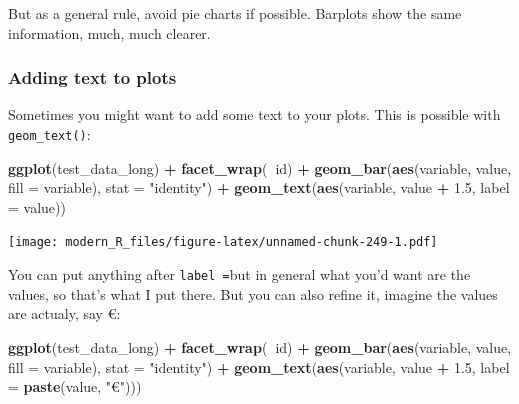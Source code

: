 \documentclass[]{gitbook}
\newenvironment{Shaded}{\begin{snugshade}}{\end{snugshade}}
\newcommand{\DataTypeTok}[1]{\textcolor[rgb]{0.13,0.29,0.53}{#1}}
\newcommand{\FloatTok}[1]{\textcolor[rgb]{0.00,0.00,0.81}{#1}}
\newcommand{\KeywordTok}[1]{\textcolor[rgb]{0.13,0.29,0.53}{\textbf{#1}}}
\newcommand{\NormalTok}[1]{#1}
\newcommand{\OperatorTok}[1]{\textcolor[rgb]{0.81,0.36,0.00}{\textbf{#1}}}
\newcommand{\StringTok}[1]{\textcolor[rgb]{0.31,0.60,0.02}{#1}}
\theoremstyle{definition}
\theoremstyle{definition}
\theoremstyle{definition}
\theoremstyle{remark}
\begin{document}
But as a general rule, avoid pie charts if possible. Barplots show the
same information, much, much clearer.

\hypertarget{adding-text-to-plots}{%
\subsubsection{Adding text to plots}\label{adding-text-to-plots}}

Sometimes you might want to add some text to your plots. This is
possible with \texttt{geom\_text()}:

\begin{Shaded}
\begin{Highlighting}[]
\KeywordTok{ggplot}\NormalTok{(test_data_long) }\OperatorTok{+}
\StringTok{  }\KeywordTok{facet_wrap}\NormalTok{(}\OperatorTok{~}\NormalTok{id) }\OperatorTok{+}
\StringTok{  }\KeywordTok{geom_bar}\NormalTok{(}\KeywordTok{aes}\NormalTok{(variable, value, }\DataTypeTok{fill =}\NormalTok{ variable), }\DataTypeTok{stat =} \StringTok{"identity"}\NormalTok{) }\OperatorTok{+}
\StringTok{  }\KeywordTok{geom_text}\NormalTok{(}\KeywordTok{aes}\NormalTok{(variable, value }\OperatorTok{+}\StringTok{ }\FloatTok{1.5}\NormalTok{, }\DataTypeTok{label =}\NormalTok{ value))}
\end{Highlighting}
\end{Shaded}

\texttt{[image: modern\_R\_files/figure-latex/unnamed-chunk-249-1.pdf]}

You can put anything after \texttt{label\ =}but in general what you'd
want are the values, so that's what I put there. But you can also refine
it, imagine the values are actualy, say €:

\begin{Shaded}
\begin{Highlighting}[]
\KeywordTok{ggplot}\NormalTok{(test_data_long) }\OperatorTok{+}
\StringTok{  }\KeywordTok{facet_wrap}\NormalTok{(}\OperatorTok{~}\NormalTok{id) }\OperatorTok{+}
\StringTok{  }\KeywordTok{geom_bar}\NormalTok{(}\KeywordTok{aes}\NormalTok{(variable, value, }\DataTypeTok{fill =}\NormalTok{ variable), }\DataTypeTok{stat =} \StringTok{"identity"}\NormalTok{) }\OperatorTok{+}
\StringTok{  }\KeywordTok{geom_text}\NormalTok{(}\KeywordTok{aes}\NormalTok{(variable, value }\OperatorTok{+}\StringTok{ }\FloatTok{1.5}\NormalTok{, }\DataTypeTok{label =} \KeywordTok{paste}\NormalTok{(value, }\StringTok{"€"}\NormalTok{)))}
\end{Highlighting}
\end{Shaded}
\end{document}

